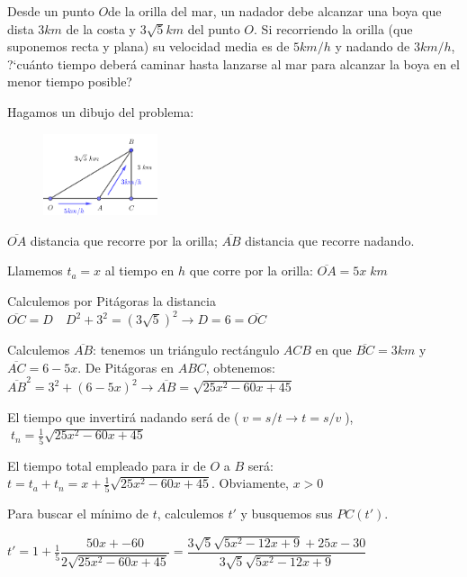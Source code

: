 	\begin{ejre} Desde un punto $O$de la orilla del mar, un nadador debe alcanzar una boya que dista $3km$ de la costa y $3	\sqrt{5} km$ del punto $O$. Si recorriendo la orilla (que suponemos recta y plana) su velocidad media es de $5km/h$ y nadando de $3km/h$, ?`cuánto tiempo deberá caminar hasta lanzarse al mar para alcanzar la boya en el menor tiempo posible?
		
	\end{ejre}
	
	\begin{proofw}\renewcommand{\qedsymbol}{$\diamond$}	
	Hagamos un dibujo del problema:
	
	\begin{multicols}{2}
		\begin{figure}[H]
			\centering
			\includegraphics[width=0.3\textwidth]{imagenes/imagenes05/T05IM46.png}
		\end{figure}
	\small{$\overline{OA}$ distancia que recorre por la orilla; $\overline{AB}$ distancia que recorre nadando.}
	
	\small{Llamemos $t_a=x$ al tiempo en $h$ que corre por la orilla: $\overline{OA}=5x\; km$}	
	
	\small{Calculemos por Pitágoras la distancia $\overline{OC}=D \quad  D^2+3^2=(3\sqrt{5})^2 \to D= 6 =\overline{OC}$}

	\end{multicols}



\normalsize{Calculemos} $\overline{AB}$: tenemos un triángulo rectángulo $ACB$ en que $\overline{BC}=3km$ y $\overline{AC}=6-5x$.
	De Pitágoras en $ABC$, obtenemos: $\overline{AB}^2=3^2+(6-5x)^2 \to \overline{AB}=\sqrt{25x^2-60x+45}$ 
	
	El tiempo que invertirá nadando será de ($\; v=s/t \to t=s/v\; $), $\; t_n=\frac 1 5 \sqrt{25x^2-60x+45}$
	
	El tiempo total empleado para ir de $O$ a $B$ será: $t=t_a+t_n=x+\frac 1 5 \sqrt{25x^2-60x+45}$. Obviamente, $x>0$
	
	Para buscar el mínimo de $t$, calculemos $t'$ y busquemos sus $PC(t')$.
	
	$t'=1+ \frac 1 5 \dfrac {50x+-60}{2 \sqrt{25x^2-60x+45}}=
	\dfrac {3\sqrt{5}\sqrt{5x^2-12x+9}+25x-30}{3\sqrt{5}\sqrt{5x^2-12x+9}}$ 
	

\end{proofw}
